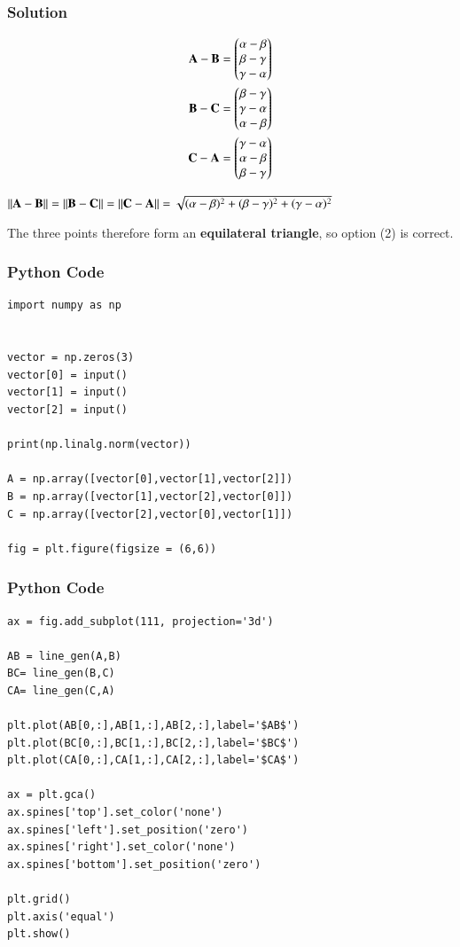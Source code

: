\documentclass{beamer}
\begin{document}
\begin{frame}[fragile]
    \frametitle{Solution}
\begin{align}
\mathbf{A-B} = \begin{pmatrix}\alpha - \beta \\ \beta - \gamma \\ \gamma - \alpha\end{pmatrix} \\
\mathbf{B-C} = \begin{pmatrix}\beta - \gamma \\ \gamma - \alpha \\ \alpha - \beta\end{pmatrix} \\
\mathbf{C-A} = \begin{pmatrix}\gamma - \alpha \\ \alpha - \beta \\ \beta - \gamma\end{pmatrix}
\end{align}


$\left\lVert\mathbf{A}-\mathbf{B}\right\rVert = \left\lVert\mathbf{B}-\mathbf{C}\right\rVert = \left\lVert\mathbf{C}-\mathbf{A}\right\rVert = \sqrt{(\alpha - \beta)^2  + (\beta - \gamma)^2 + (\gamma - \alpha)^2}$ 


The three points therefore form an \textbf{equilateral triangle}, so option (2) is correct.

\end{frame}


\begin{frame}[fragile]
\frametitle{Python Code}
\begin{lstlisting}
import numpy as np


vector = np.zeros(3)
vector[0] = input()
vector[1] = input()
vector[2] = input()

print(np.linalg.norm(vector))

A = np.array([vector[0],vector[1],vector[2]])
B = np.array([vector[1],vector[2],vector[0]])
C = np.array([vector[2],vector[0],vector[1]])

fig = plt.figure(figsize = (6,6))
\end{lstlisting}
\end{frame}

\begin{frame}[fragile]
\frametitle{Python Code}
\begin{lstlisting}
ax = fig.add_subplot(111, projection='3d')

AB = line_gen(A,B)
BC= line_gen(B,C)
CA= line_gen(C,A)

plt.plot(AB[0,:],AB[1,:],AB[2,:],label='$AB$')
plt.plot(BC[0,:],BC[1,:],BC[2,:],label='$BC$')
plt.plot(CA[0,:],CA[1,:],CA[2,:],label='$CA$')

ax = plt.gca()
ax.spines['top'].set_color('none')
ax.spines['left'].set_position('zero')
ax.spines['right'].set_color('none')
ax.spines['bottom'].set_position('zero')

plt.grid()
plt.axis('equal')
plt.show()

\end{lstlisting}

\end{frame}
\end{document}

